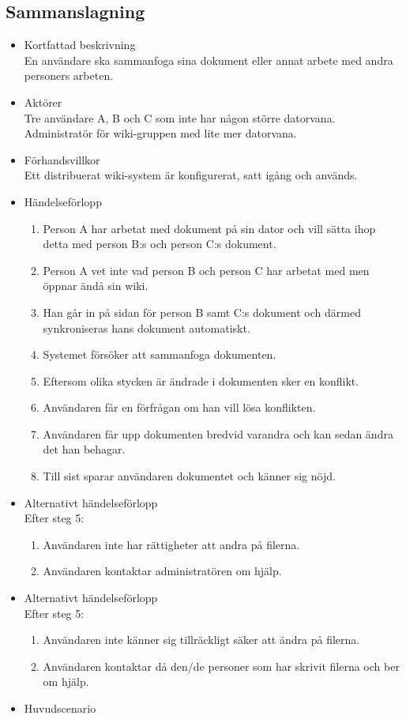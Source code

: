 \subsection{Sammanslagning}
\begin{itemize}
	\item Kortfattad beskrivning
	\\En användare ska sammanfoga sina dokument eller annat arbete med andra personers arbeten.
	\item Aktörer
	\\Tre användare A, B och C som inte har någon större datorvana.
	\\Administratör för wiki-gruppen med lite mer datorvana.	
	\item Förhandsvillkor
	\\Ett distribuerat wiki-system är konfigurerat, satt igång och används.
	\item Händelseförlopp
	\begin{enumerate}
		\item Person A har arbetat med dokument på sin dator och vill sätta ihop detta med person B:s och person C:s dokument.
		\item Person A vet inte vad person B och person C har arbetat med men öppnar ändå sin wiki.
		\item Han går in på sidan för person B samt C:s dokument och därmed synkroniseras hans dokument automatiskt.
		\item Systemet försöker att sammanfoga dokumenten.
		\item Eftersom olika stycken är ändrade i dokumenten sker en konflikt.
		\item Användaren får en förfrågan om han vill lösa konflikten.
		\item Användaren får upp dokumenten bredvid varandra och kan sedan ändra det han behagar.
		\item Till sist sparar användaren dokumentet och känner sig nöjd.
	\end{enumerate}
	\item Alternativt händelseförlopp
	\\Efter steg 5:
	\begin{enumerate}	
		\item Användaren inte har rättigheter att andra på filerna.
		\item Användaren kontaktar administratören om hjälp.
	\end{enumerate}	
	\item Alternativt händelseförlopp
	\\Efter steg 5: 
	\begin{enumerate}	
		\item Användaren inte känner sig tillräckligt säker att ändra på filerna.
		\item Användaren kontaktar då den/de personer som har skrivit filerna och ber om hjälp.
	\end{enumerate}
	\item Huvudscenario
	

\end{itemize}
